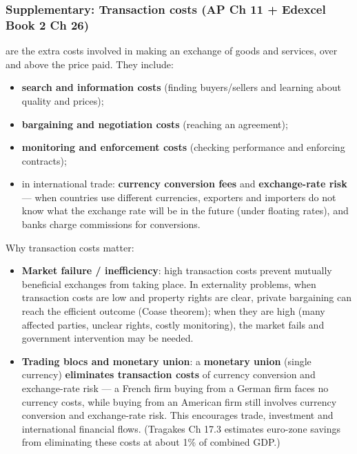 \subsubsection*{Supplementary: Transaction costs (AP Ch 11 + Edexcel Book 2 Ch 26)}
 are the extra costs involved in making an exchange of goods and services, over and above the price paid. They include:
\begin{itemize}
  \item \textbf{search and information costs} (finding buyers/sellers and learning about quality and prices);
  \item \textbf{bargaining and negotiation costs} (reaching an agreement);
  \item \textbf{monitoring and enforcement costs} (checking performance and enforcing contracts);
  \item in international trade: \textbf{currency conversion fees} and \textbf{exchange-rate risk} --- when countries use different currencies, exporters and importers do not know what the exchange rate will be in the future (under floating rates), and banks charge commissions for conversions.
\end{itemize}
Why transaction costs matter:
\begin{itemize}
  \item \textbf{Market failure / inefficiency}: high transaction costs prevent mutually beneficial exchanges from taking place. In externality problems, when transaction costs are low and property rights are clear, private bargaining can reach the efficient outcome (Coase theorem); when they are high (many affected parties, unclear rights, costly monitoring), the market fails and government intervention may be needed.
  \item \textbf{Trading blocs and monetary union}: a \textbf{monetary union} (single currency) \textbf{eliminates transaction costs} of currency conversion and exchange-rate risk --- a French firm buying from a German firm faces no currency costs, while buying from an American firm still involves currency conversion and exchange-rate risk. This encourages trade, investment and international financial flows. (Tragakes Ch 17.3 estimates euro-zone savings from eliminating these costs at about 1\% of combined GDP.)
\end{itemize}

